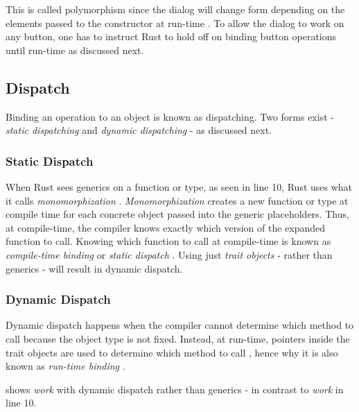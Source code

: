 This is called polymorphism since the dialog will change form depending on the elements passed to the constructor at run-time \cite{savitch_15_01,malik_09_01,gamma_94_01}.
To allow the dialog to work on any button, one has to instruct Rust to hold off on binding button operations until run-time as discussed next.

\subsection{Dispatch}
Binding an operation to an object is known as dispatching.
Two forms exist - \textit{static dispatching} and \textit{dynamic dispatching} - as discussed next.

\subsubsection{Static Dispatch}
When Rust sees generics on a function or type, as seen in  line 10, Rust uses what it calls \textit{monomorphization} \cite{klabnik_2019_01}.
\textit{Monomorphization} creates a new function or type at compile time for each concrete object passed into the generic placeholders.
Thus, at compile-time, the compiler knows exactly which version of the expanded function to call.
Knowing which function to call at compile-time is known as \textit{compile-time binding} \cite{malik_09_01} or \textit{static dispatch} \cite{klabnik_2019_01, alexandrescu_01_01}.
Using just \textit{trait objects} - rather than generics - will result in dynamic dispatch.

\subsubsection{Dynamic Dispatch}
Dynamic dispatch \cite{alexandrescu_01_01, klabnik_2019_01} happens when the compiler cannot determine which method to call because the object type is not fixed.
Instead, at run-time, pointers inside the trait objects are used to determine which method to call \cite{klabnik_2019_01}, hence why it is also known as \textit{run-time binding} \cite{malik_09_01}.

 shows \textit{work} with dynamic dispatch rather than generics - in contrast to \textit{work} in  line 10.


